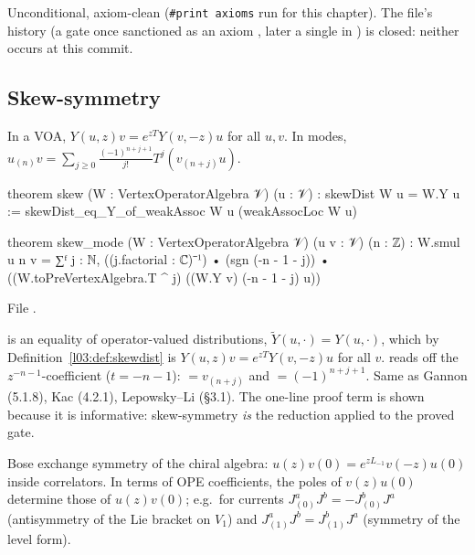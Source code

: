 \begin{status}
Unconditional, axiom-clean (\texttt{\#print axioms}  run for this
chapter). The file's history (a gate once sanctioned as an axiom , later a single
 in ) is closed: neither occurs at this commit.
\end{status}

\subsection{Skew-symmetry}

\begin{theorem}\label{l03:thm:skew}
In a VOA, $Y(u,z)v = e^{zT}Y(v,-z)u$ for all $u,v$. In modes,
$u_{(n)}v = \sum_{j\ge0}\frac{(-1)^{n+j+1}}{j!}T^j(v_{(n+j)}u)$.
\end{theorem}
\begin{leancode}
theorem skew (W : VertexOperatorAlgebra 𝒱) (u : 𝒱) : skewDist W u = W.Y u :=
  skewDist_eq_Y_of_weakAssoc W u (weakAssocLoc W u)

theorem skew_mode (W : VertexOperatorAlgebra 𝒱) (u v : 𝒱) (n : ℤ) :
    W.smul u n v
      = ∑ᶠ j : ℕ, ((j.factorial : ℂ)⁻¹) • (sgn (-n - 1 - j)) •
          ((W.toPreVertexAlgebra.T ^ j) ((W.Y v) (-n - 1 - j) u))
\end{leancode}
File .

\begin{dictionary}
 is an equality of operator-valued distributions, $\tilde Y(u,\cdot) = Y(u,\cdot)$, which by
Definition~\ref{l03:def:skewdist} is $Y(u,z)v = e^{zT}Y(v,-z)u$ for all $v$.  reads
off the $z^{-n-1}$-coefficient ($t = -n-1$):  $=v_{(n+j)}$ and
 $=(-1)^{n+j+1}$. Same as Gannon (5.1.8), Kac (4.2.1), Lepowsky--Li (§3.1). The
one-line proof term is shown because it is informative: skew-symmetry \emph{is} the reduction applied
to the proved gate.
\end{dictionary}

\begin{physics}
Bose exchange symmetry of the chiral algebra: $u(z)v(0) = e^{zL_{-1}}v(-z)u(0)$ inside correlators.
In terms of OPE coefficients, the poles of $v(z)u(0)$ determine those of $u(z)v(0)$; e.g.\ for
currents $J^a_{(0)}J^b = -J^b_{(0)}J^a$ (antisymmetry of the Lie bracket on $V_1$) and
$J^a_{(1)}J^b = J^b_{(1)}J^a$ (symmetry of the level form).
\end{physics}

